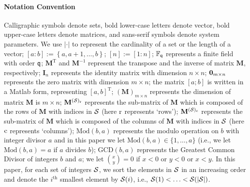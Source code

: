 \documentclass[conference,letterpaper]{IEEEtran}
\begin{document}
\paragraph*{Notation Convention}
Calligraphic symbols denote sets,  
bold lower-case letters denote vector, bold
upper-case letters denote matrices,
and sans-serif symbols denote system parameters.
We use $|\cdot|$ to represent the cardinality of a set or the length of a vector;
$[a:b]:=\left\{ a,a+1,\ldots,b\right\}$; %
  $[n] := [1:n]$;
$\mathbb{F}_{{\sf q}}$ represents a  finite field with order ${\sf q}$;         
$\mathbf{M}^{\text{T}}$  and $\mathbf{M}^{-1}$ represent the transpose  and the inverse of matrix $\mathbf{M}$, respectively;
$\mathbf{I}_n$ represents the identity matrix with dimension $n \times n$;
${\bf 0}_{m \times n}$ represents the zero  matrix with dimension $m\times n$; 
 the matrix $[a;b]$ is written in a Matlab form, representing $[a,b]^{\text{T}}$;
$(\mathbf{M})_{m \times n}$ represents the dimension of matrix $\mathbf{M}$ is $m \times n$;
$\mathbf{M}^{({\cal S})_{\rm r}}$ represents the sub-matrix of $\mathbf{M}$ which is composed of the rows  of $\mathbf{M}$ with indices in ${\cal S}$ (here $\rm r$ represents `rows'); 
$\mathbf{M}^{({\cal S})_{\rm c}}$ represents the sub-matrix of $\mathbf{M}$ which is composed of the columns  of $\mathbf{M}$ with indices in ${\cal S}$ (here $\rm c$ represents `columns'); 
 $\text{Mod} (b,a)$ represents the modulo operation on $b$ with  integer divisor $a$ and in this paper we let $\text{Mod}(b,a)\in \{1,\ldots,a \}$ (i.e., we let $ \text{Mod}(b,a)=a$ if $a$ divides $b$);
$\text{GCD}(b,a)$ represents the Greatest Common Divisor of integers $b$ and $a$;   
we let $\binom{x}{y}=0$ if $x<0$ or $y<0$ or $x<y$.
 In this paper, for each set  of integers  ${\cal S}$, we sort the elements in ${\cal S}$ in an increasing order and denote the $i^{\text{th}}$ smallest element by ${\cal S}(i)$, i.e., ${\cal S}(1)<\ldots<{\cal S}(|{\cal S}|)$.
\end{document}
